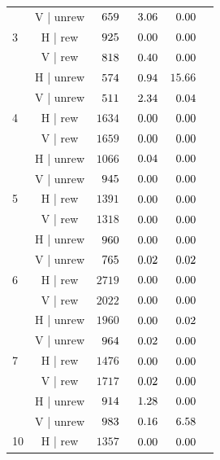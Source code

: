 \begin{table}[htbp]
\begin{tabular}{lccccc}
 & V | unrew & $\hphantom{0}659$ & $\hphantom{0}3.06$ & $\hphantom{0}0.00$ &  \\
3 & H | rew\hphantom{un} & $\hphantom{0}925$ & $\hphantom{0}0.00$ & $\hphantom{0}0.00$ &  \\
 & V | rew\hphantom{un} & $\hphantom{0}818$ & $\hphantom{0}0.40$ & $\hphantom{0}0.00$ &  \\
 & H | unrew & $\hphantom{0}574$ & $\hphantom{0}0.94$ & $15.66$ &  \\
 & V | unrew & $\hphantom{0}511$ & $\hphantom{0}2.34$ & $\hphantom{0}0.04$ &  \\
4 & H | rew\hphantom{un} & $1634$ & $\hphantom{0}0.00$ & $\hphantom{0}0.00$ &  \\
 & V | rew\hphantom{un} & $1659$ & $\hphantom{0}0.00$ & $\hphantom{0}0.00$ &  \\
 & H | unrew & $1066$ & $\hphantom{0}0.04$ & $\hphantom{0}0.00$ &  \\
 & V | unrew & $\hphantom{0}945$ & $\hphantom{0}0.00$ & $\hphantom{0}0.00$ &  \\
5 & H | rew\hphantom{un} & $1391$ & $\hphantom{0}0.00$ & $\hphantom{0}0.00$ &  \\
 & V | rew\hphantom{un} & $1318$ & $\hphantom{0}0.00$ & $\hphantom{0}0.00$ &  \\
 & H | unrew & $\hphantom{0}960$ & $\hphantom{0}0.00$ & $\hphantom{0}0.00$ &  \\
 & V | unrew & $\hphantom{0}765$ & $\hphantom{0}0.02$ & $\hphantom{0}0.02$ &  \\
6 & H | rew\hphantom{un} & $2719$ & $\hphantom{0}0.00$ & $\hphantom{0}0.00$ &  \\
 & V | rew\hphantom{un} & $2022$ & $\hphantom{0}0.00$ & $\hphantom{0}0.00$ &  \\
 & H | unrew & $1960$ & $\hphantom{0}0.00$ & $\hphantom{0}0.02$ &  \\
 & V | unrew & $\hphantom{0}964$ & $\hphantom{0}0.02$ & $\hphantom{0}0.00$ &  \\
7 & H | rew\hphantom{un} & $1476$ & $\hphantom{0}0.00$ & $\hphantom{0}0.00$ &  \\
 & V | rew\hphantom{un} & $1717$ & $\hphantom{0}0.02$ & $\hphantom{0}0.00$ &  \\
 & H | unrew & $\hphantom{0}914$ & $\hphantom{0}1.28$ & $\hphantom{0}0.00$ &  \\
 & V | unrew & $\hphantom{0}983$ & $\hphantom{0}0.16$ & $\hphantom{0}6.58$ &  \\
10 & H | rew\hphantom{un} & $1357$ & $\hphantom{0}0.00$ & $\hphantom{0}0.00$ &  \\

\end{tabular}
\end{table}
